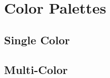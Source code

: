\section{Color Palettes}

\subsection{Single Color}

\csep
{}\csep
{}
\par

\subsection{Multi-Color}

